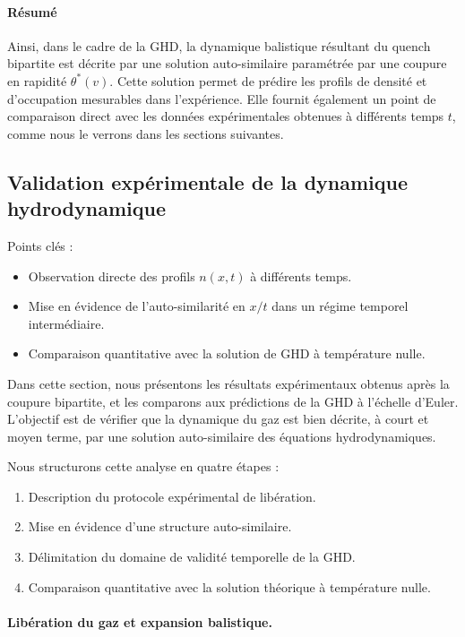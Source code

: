 \paragraph{Résumé}

Ainsi, dans le cadre de la GHD, la dynamique balistique résultant du quench bipartite est décrite par une solution auto-similaire paramétrée par une coupure en rapidité $\theta^*(v)$. Cette solution permet de prédire les profils de densité et d’occupation mesurables dans l’expérience. Elle fournit également un point de comparaison direct avec les données expérimentales obtenues à différents temps $t$, comme nous le verrons dans les sections suivantes.




\subsection{Validation expérimentale de la dynamique hydrodynamique}
\label{sec.don_exp}

{\color{blue}
Points clés :
\begin{itemize}
	\item Observation directe des profils $n(x,t)$ à différents temps.
	\item Mise en évidence de l’auto-similarité en $x/t$ dans un régime temporel intermédiaire.
	\item Comparaison quantitative avec la solution de GHD à température nulle.
\end{itemize}
}


Dans cette section, nous présentons les résultats expérimentaux obtenus après la coupure bipartite, et les comparons aux prédictions de la GHD à l’échelle d’Euler. L’objectif est de vérifier que la dynamique du gaz est bien décrite, à court et moyen terme, par une solution auto-similaire des équations hydrodynamiques.

Nous structurons cette analyse en quatre étapes :
\begin{enumerate}
    \item Description du protocole expérimental de libération.
    \item Mise en évidence d’une structure auto-similaire.
    \item Délimitation du domaine de validité temporelle de la GHD.
    \item Comparaison quantitative avec la solution théorique à température nulle.
\end{enumerate}

\paragraph{Libération du gaz et expansion balistique.}

